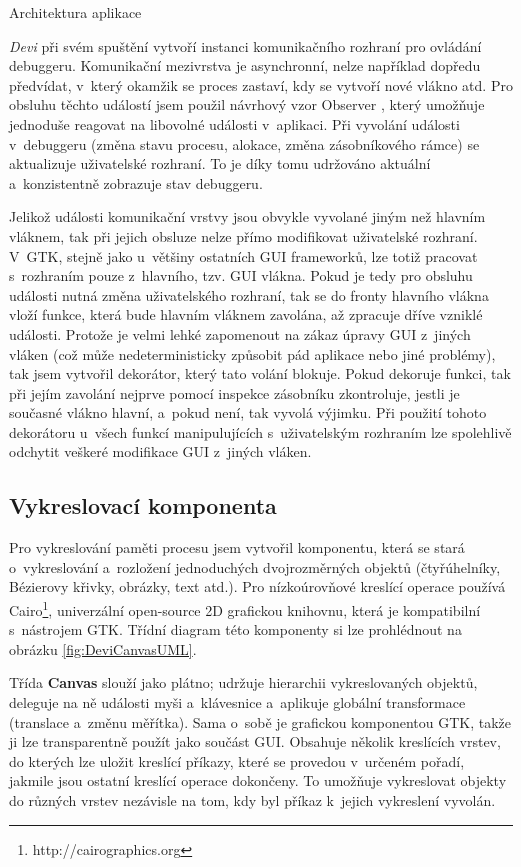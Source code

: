 \documentclass[czech,bachelor,male,python,dept460,hidelinks]{diploma}						%
\newcommand{\parspace}[1][]{
	\ifthenelse{\isempty{#1}}{\vspace{0mm}}{\vspace{#1}}
	\par
}
\begin{document}
\begin{section}{Architektura aplikace}
	\parspace \textit{Devi} při svém spuštění vytvoří instanci komunikačního rozhraní pro ovládání debuggeru. Komunikační mezivrstva je asynchronní,
	nelze například dopředu předvídat, v~který okamžik se proces zastaví, kdy se vytvoří nové vlákno atd. Pro obsluhu těchto událostí jsem použil návrhový vzor
	Observer \cite[326]{gof}, který umožňuje jednoduše reagovat na libovolné události v~aplikaci. Při vyvolání události v~debuggeru (změna stavu procesu,
	alokace, změna zásobníkového rámce) se aktualizuje uživatelské rozhraní. To je díky tomu udržováno aktuální a~konzistentně zobrazuje
	stav debuggeru.
	
	\parspace Jelikož události komunikační vrstvy jsou obvykle vyvolané jiným než hlavním vláknem, tak při jejich obsluze nelze přímo modifikovat uživatelské
	rozhraní. V~GTK, stejně jako u~většiny ostatních GUI frameworků, lze totiž pracovat s~rozhraním pouze z~hlavního, tzv. GUI vlákna. Pokud je tedy pro
	obsluhu události nutná změna uživatelského rozhraní, tak se do fronty hlavního vlákna vloží funkce, která bude hlavním vláknem zavolána,
	až zpracuje dříve vzniklé události. Protože je velmi lehké zapomenout na zákaz úpravy GUI z~jiných vláken (což může nedeterministicky způsobit pád
	aplikace nebo jiné problémy), tak jsem vytvořil dekorátor, který tato volání blokuje. Pokud dekoruje funkci, tak při jejím zavolání
	nejprve pomocí inspekce zásobníku zkontroluje, jestli je současné vlákno hlavní, a~pokud není, tak vyvolá výjimku. Při použití tohoto dekorátoru u~všech
	funkcí manipulujících s~uživatelským rozhraním lze spolehlivě odchytit veškeré modifikace GUI z~jiných vláken.
	
	\subsection{Vykreslovací komponenta}
	Pro vykreslování paměti procesu jsem vytvořil komponentu, která se stará o~vykreslování a~rozložení jednoduchých dvojrozměrných objektů
	(čtyřúhelníky, Bézierovy křivky, obrázky, text atd.). Pro nízkoúrovňové kreslící operace používá Cairo\footnote{http://cairographics.org}, univerzální
	open-source 2D grafickou knihovnu, která je kompatibilní s~nástrojem GTK. Třídní diagram této komponenty si lze prohlédnout na obrázku
	\ref{fig:DeviCanvasUML}.
	
	
	Třída \textbf{Canvas} slouží jako plátno; udržuje hierarchii vykreslovaných objektů, deleguje na ně události myši a~klávesnice a~aplikuje globální transformace
	(translace a~změnu měřítka). Sama o~sobě je grafickou komponentou GTK, takže ji lze transparentně použít jako součást GUI.
	Obsahuje několik kreslících vrstev, do kterých lze uložit kreslící příkazy, které se provedou v~určeném pořadí, jakmile jsou ostatní kreslící operace dokončeny.
	To umožňuje vykreslovat objekty do různých vrstev nezávisle na tom, kdy byl příkaz k~jejich vykreslení vyvolán.
	

\end{section}
\end{document}
